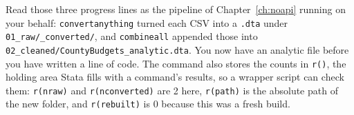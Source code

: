 \documentclass[
    a4paper,
    fontsize=10pt,
    twoside=true,
    numbers=noenddot,
]{kaobook}
\begin{document}
Read those three progress lines as the pipeline of Chapter~\ref{ch:noapi} running on your behalf: \texttt{convertanything} turned each CSV into a \texttt{.dta} under \texttt{01\_raw/\_converted/}, and \texttt{combineall} appended those into \texttt{02\_cleaned/CountyBudgets\_analytic.dta}. You now have an analytic file before you have written a line of code. The command also stores the counts in \texttt{r()}, the holding area Stata fills with a command's results, so a wrapper script can check them: \texttt{r(nraw)} and \texttt{r(nconverted)} are 2 here, \texttt{r(path)} is the absolute path of the new folder, and \texttt{r(rebuilt)} is 0 because this was a fresh build.
\end{document}
